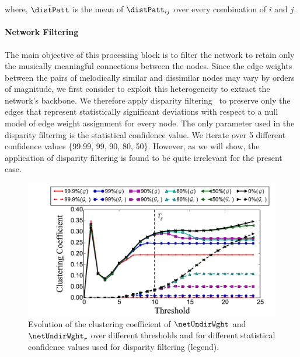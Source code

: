 {\noindent where, $\bar{\distPatt}$ is the mean of $\distPatt_{ij}$ over every combination of $i$ and $j$. 


\paragraph{Network Filtering}
\label{sec:network_filtering}

The main objective of this processing block is to filter the network to retain only the musically meaningful connections between the nodes. Since the edge weights between the pairs of melodically similar and dissimilar nodes may vary by orders of magnitude, we first consider to exploit this heterogeneity to extract the network's backbone. We therefore apply disparity filtering~\citep{Serrano09PNAS} to preserve only the edges that represent statistically significant deviations with respect to a null model of edge weight assignment for every node. The only parameter used in the disparity filtering is the statistical confidence value. We iterate over 5 different confidence values $\lbrace$99.99, 99, 90, 80, 50$\rbrace$. However, as we will show, the application of disparity filtering is found to be quite irrelevant for the present case.

\begin{figure}
	\begin{center}
		\includegraphics[width=\figSizeHundred]{ch06_patterns/figures/Characterization/CC_Curves_shrunk.pdf}
	\end{center}
	\caption{Evolution of the clustering coefficient of $\netUndirWght$ and $\netUndirWght_r$ over different thresholds and for different statistical confidence values used for disparity filtering (legend).}
	\label{fig:cc_curve_pattern_characterization}
\end{figure}

}
